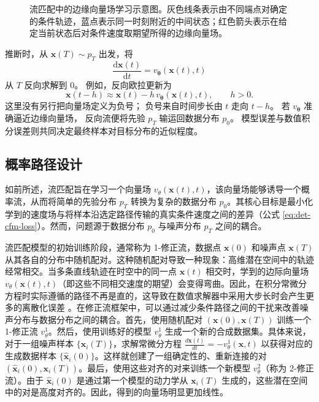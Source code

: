 \begin{figure}[!t]
\centering
{}
\caption{流匹配中的边缘向量场学习示意图。灰色线条表示由不同端点对确定的条件轨迹，蓝点表示同一时刻附近的中间状态；红色箭头表示在给定当前状态后对条件速度取期望所得的边缘向量场。}
\label{fig:marginal-vector-field}
\end{figure}

推断时，从
\(\mathbf{x}(T)\sim p_T\)
出发，将
\begin{equation}
    \frac{\mathrm{d}\mathbf{x}(t)}{\mathrm{d}t}
    =
    v_{\boldsymbol{\theta}}(\mathbf{x}(t),t)
    \label{eq:det-fm-generation-ode}
\end{equation}
从 \(T\) 反向求解到 \(0\)。
例如，反向欧拉更新为
\begin{equation}
    \mathbf{x}(t-h)
    \approx
    \mathbf{x}(t)
    -
    h\,v_{\boldsymbol{\theta}}(\mathbf{x}(t),t),
    \qquad h>0.
    \label{eq:det-fm-backward-euler}
\end{equation}
这里没有另行把向量场定义为负号；
负号来自时间步长由 \(t\) 走向 \(t-h\)。
若 \(v_{\boldsymbol{\theta}}\) 准确逼近边缘向量场，
反向流便将先验 \(p_T\) 输运回数据分布 \(p_0\)。
模型误差与数值积分误差则共同决定最终样本对目标分布的近似程度。

\subsection{概率路径设计}

如前所述，流匹配旨在学习一个向量场 $v_\theta(\mathbf{x}(t), t)$，该向量场能够诱导一个概率流，从而将简单的先验分布 $p_T$ 转换为复杂的数据分布 $p_0$。其核心目标是最小化学到的速度场与将样本沿选定路径传输的真实条件速度之间的差异（公式 \ref{eq:det-cfm-loss}）。然而，问题源于数据分布 $p_0$ 与噪声分布 $p_T$ 之间的耦合。

流匹配模型的初始训练阶段，通常称为 1-修正流，数据点 $\mathbf{x}(0)$ 和噪声点 $\mathbf{x}(T)$ 从其各自的分布中随机配对。这种随机配对导致一种现象：高维潜在空间中的轨迹经常相交。当多条直线轨迹在时空中的同一点 $\mathbf{x}(t)$ 相交时，学到的边际向量场 $v_\theta(\mathbf{x}(t), t)$（即这些不同相交速度的期望）会变得弯曲。因此，在积分常微分方程时实际遵循的路径不再是直的，这导致在数值求解器中采用大步长时会产生更多的离散化误差 \citep{zhang-etal:2025:flow,yang-etal:2025text}。在修正流框架中，可以通过减少条件路径之间的干扰来改善噪声分布与数据分布之间的耦合。首先，使用随机配对 $(\mathbf{x}(0), \mathbf{x}(T))$ 训练一个 1-修正流 $v_{\theta}^1$。然后，使用训练好的模型 $v_{\theta}^1$ 生成一个新的合成数据集。具体来说，对于一组噪声样本 $\{\mathbf{x}_i(T)\}$，求解常微分方程 $\frac{d\mathbf{x}(t)}{dt} = -v_{\theta}^1(\mathbf{x}, t)$ 以获得对应的生成数据样本 $\{\hat{\mathbf{x}}_i(0)\}$。这样就创建了一组确定性的、重新连接的对 $(\hat{\mathbf{x}}_i(0), \mathbf{x}_i(T))$。最后，使用这些对齐的对来训练一个新模型 $v_{\theta}^2$（称为 2-修正流）。由于 $\hat{\mathbf{x}}_i(0)$ 是通过第一个模型的动力学从 $\mathbf{x}_i(T)$ 生成的，这些潜在空间中的对是高度对齐的。因此，得到的向量场明显更加线性。

